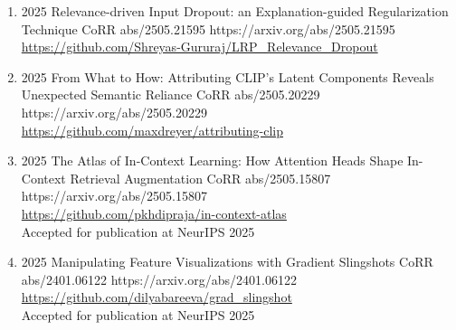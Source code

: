 {\begin{enumerate}
    
        \item {}
                        {2025}
                        {Relevance-driven Input Dropout: an Explanation-guided Regularization Technique}
                        {CoRR abs/2505.21595}
                        {https://arxiv.org/abs/2505.21595}
                        {
                            \\\href{https://github.com/Shreyas-Gururaj/LRP_Relevance_Dropout}{https://github.com/Shreyas-Gururaj/LRP\_Relevance\_Dropout}
                        }
    
    
        \item {}
                        {2025}
                        {From What to How: Attributing CLIP's Latent Components Reveals Unexpected Semantic Reliance}
                        {CoRR abs/2505.20229}
                        {https://arxiv.org/abs/2505.20229}
                        {
                            \\\href{https://github.com/maxdreyer/attributing-clip}{https://github.com/maxdreyer/attributing-clip}
                        }
             
             
        \item {}
                        {2025}
                        {The Atlas of In-Context Learning: How Attention Heads Shape In-Context Retrieval Augmentation}
                        {CoRR abs/2505.15807}
                        {https://arxiv.org/abs/2505.15807}
                        {
                            \\\href{https://github.com/pkhdipraja/in-context-atlas}{https://github.com/pkhdipraja/in-context-atlas}
                            \\Accepted for publication at NeurIPS 2025
                        }




        \item {}
                        {2025}
                        {Manipulating Feature Visualizations with Gradient Slingshots}
                        {CoRR abs/2401.06122}
                        {https://arxiv.org/abs/2401.06122}
                        {
                             \\\href{https://github.com/dilyabareeva/grad_slingshot}{https://github.com/dilyabareeva/grad\_slingshot}
                             \\Accepted for publication at NeurIPS 2025
                        }


\end{enumerate}}
